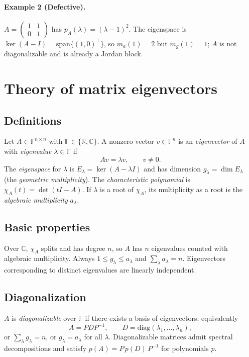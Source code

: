 \documentclass[12pt,a4paper]{article}
\theoremstyle{plain}
\theoremstyle{definition}
\theoremstyle{remark}
\theoremstyle{remark}
\begin{document}
	\paragraph{Example 2 (Defective).}
	$A=\begin{pmatrix}1&1\\0&1\end{pmatrix}$ has $p_A(\lambda)=(\lambda-1)^2$. The eigenspace is $\ker(A-I)=\mathrm{span}\{(1,0)^\top\}$, so $m_a(1)=2$ but $m_g(1)=1$; $A$ is not diagonalizable and is already a Jordan block.
	
	
	\section*{Theory of matrix eigenvectors}
	
	\subsection*{Definitions}
	
	Let $A\in\mathbb{F}^{n\times n}$ with $\mathbb{F}\in\{\mathbb{R},\mathbb{C}\}$.
	A nonzero vector $v\in\mathbb{F}^n$ is an \emph{eigenvector} of $A$ with \emph{eigenvalue} $\lambda\in\mathbb{F}$
	if
	\[
	A v = \lambda v , \qquad v\ne 0 .
	\]
	The \emph{eigenspace} for $\lambda$ is $E_\lambda=\ker(A-\lambda I)$ and has dimension
	$g_\lambda=\dim E_\lambda$ (the \emph{geometric multiplicity}).
	The \emph{characteristic polynomial} is $\chi_A(t)=\det(tI-A)$.
	If $\lambda$ is a root of $\chi_A$, its multiplicity as a root is the \emph{algebraic multiplicity} $a_\lambda$.
	
	\smallskip
	
	\subsection*{Basic properties}
	
	Over $\mathbb{C}$, $\chi_A$ splits and has degree $n$, so $A$ has $n$ eigenvalues counted with algebraic multiplicity.
	Always $1\le g_\lambda\le a_\lambda$ and $\sum_\lambda a_\lambda=n$.
	Eigenvectors corresponding to distinct eigenvalues are linearly independent.
	
	\smallskip
	
	\subsection*{Diagonalization}
	
	$A$ is \emph{diagonalizable} over $\mathbb{F}$ if there exists a basis of eigenvectors; equivalently
	\[
	A=P D P^{-1}, \qquad D=\mathrm{diag}(\lambda_1,\dots,\lambda_n),
	\]
	or $\sum_\lambda g_\lambda=n$, or $g_\lambda=a_\lambda$ for all $\lambda$.
	Diagonalizable matrices admit spectral decompositions and satisfy $p(A)=P\,p(D)\,P^{-1}$ for polynomials $p$.
	
\end{document}
